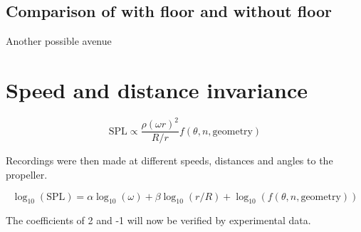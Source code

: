 \documentclass{article}
\begin{document}
\subsection{Comparison of with floor and without floor}
Another possible avenue



\section{Speed and distance invariance}

\begin{equation}
    \text{SPL} \propto \frac{\rho (\omega r)^2}{R/r} f(\theta, n, \text{geometry}) 
\end{equation}

Recordings were then made at different speeds, distances and angles to the propeller.

\begin{equation}
    \log_{10}(\text{SPL}) = \alpha \log_{10}(\omega) + \beta \log_{10}(r/R) + \log_{10}(f(\theta, n, \text{geometry}))
\end{equation}

The coefficients of 2 and -1 will now be verified by experimental data.

\end{document}
